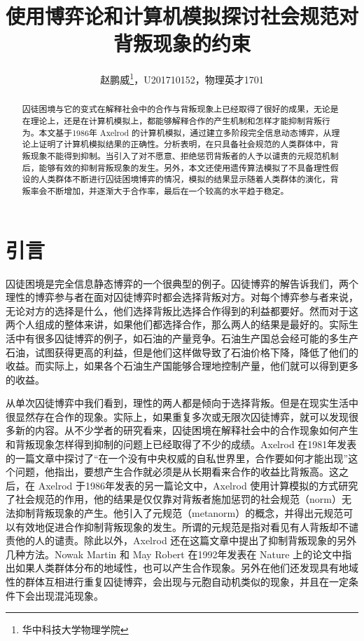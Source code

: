 \documentclass[lang=cn,11pt]{elegantpaper}
\title{使用博弈论和计算机模拟探讨社会规范对背叛现象的约束}
\author{赵鹏威\footnote{华中科技大学物理学院}，U201710152，物理英才1701}
\begin{document}
	
	\maketitle
	
	\begin{abstract}
		\noindent 囚徒困境与它的变式在解释社会中的合作与背叛现象上已经取得了很好的成果，无论是在理论上，还是在计算机模拟上，都能够解释合作的产生机制和怎样才能抑制背叛行为。本文基于1986年 Axelrod 的计算机模拟，通过建立多阶段完全信息动态博弈，从理论上证明了计算机模拟结果的正确性。分析表明，在只具备社会规范的人类群体中，背叛现象不能得到抑制。当引入了对不愿意、拒绝惩罚背叛者的人予以谴责的元规范机制后，能够有效的抑制背叛现象的发生。另外，本文还使用遗传算法模拟了不具备理性假设的人类群体不断进行囚徒困境博弈的情况，模拟的结果显示随着人类群体的演化，背叛率会不断增加，并逐渐大于合作率，最后在一个较高的水平趋于稳定。
	\end{abstract}

\section{引言}\label{sec:引言}
囚徒困境是完全信息静态博弈的一个很典型的例子。囚徒博弈的解告诉我们，两个理性的博弈参与者在面对囚徒博弈时都会选择背叛对方。对每个博弈参与者来说，无论对方的选择是什么，他们选择背叛比选择合作得到的利益都要好。然而对于这两个人组成的整体来讲，如果他们都选择合作，那么两人的结果是最好的。实际生活中有很多囚徒博弈的例子，如石油的产量竞争。石油生产国总会经可能的多生产石油，试图获得更高的利益，但是他们这样做导致了石油价格下降，降低了他们的收益。而实际上，如果各个石油生产国能够合理地控制产量，他们就可以得到更多的收益。

从单次囚徒博弈中我们看到，理性的两人都是倾向于选择背叛。但是在现实生活中很显然存在合作的现象。实际上，如果重复多次或无限次囚徒博弈，就可以发现很多新的内容。从不少学者的研究看来，囚徒困境在解释社会中的合作现象如何产生和背叛现象怎样得到抑制的问题上已经取得了不少的成绩。Axelrod 在1981年发表的一篇文章\cite{axelrod1981evolution}中探讨了“在一个没有中央权威的自私世界里，合作要如何才能出现”这个问题，他指出，要想产生合作就必须是从长期看来合作的收益比背叛高。这之后，在 Axelrod 于1986年发表的另一篇论文\cite{Axelrod1986}中，Axelrod 使用计算模拟的方式研究了社会规范的作用，他的结果是仅仅靠对背叛者施加惩罚的社会规范（norm）无法抑制背叛现象的产生。他引入了元规范（metanorm）的概念，并得出元规范可以有效地促进合作抑制背叛现象的发生。所谓的元规范是指对看见有人背叛却不谴责他的人的谴责。除此以外，Axelrod 还在这篇文章中提出了抑制背叛现象的另外几种方法。Nowak Martin 和 May Robert 在1992年发表在 Nature 上的论文\cite{1992Nature}中指出如果人类群体分布的地域性，也可以产生合作现象。另外在他们还发现具有地域性的群体互相进行重复囚徒博弈，会出现与元胞自动机类似的现象，并且在一定条件下会出现混沌现象。
\end{document}
